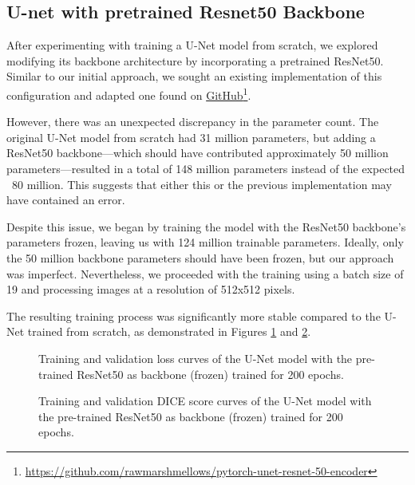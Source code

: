 \subsection{U-net with pretrained Resnet50 Backbone}

After experimenting with training a U-Net model from scratch, we explored modifying its backbone 
architecture by incorporating a pretrained ResNet50. Similar to our initial approach, we sought 
an existing implementation of this configuration and adapted one found on \href{https://github.com/rawmarshmellows/pytorch-unet-resnet-50-encoder}{GitHub}\footnote{\url{https://github.com/rawmarshmellows/pytorch-unet-resnet-50-encoder}}. 

However, there was an unexpected discrepancy in the parameter count. The original U-Net model from 
scratch had 31 million parameters, but adding a ResNet50 backbone—which should have contributed 
approximately 50 million parameters—resulted in a total of 148 million parameters instead of the 
expected ~80 million. This suggests that either this or the previous implementation may have 
contained an error.

Despite this issue, we began by training the model with the ResNet50 backbone's parameters frozen, 
leaving us with 124 million trainable parameters. Ideally, only the 50 million backbone parameters 
should have been frozen, but our approach was imperfect. Nevertheless, we proceeded with the training 
using a batch size of 19 and processing images at a resolution of 512x512 pixels.

The resulting training process was significantly more stable compared to the U-Net trained from 
scratch, as demonstrated in Figures \ref{fig:renet50_frozen_loss_curve} and \ref{fig:renet50_frozen_dice_curve}.


\begin{figure}[ht]
    \centering
    \caption{Training and validation loss curves of the U-Net model with the pre-trained ResNet50 as backbone (frozen) trained for 200 epochs.}
    \label{fig:renet50_frozen_loss_curve}
\end{figure}

\begin{figure}[ht]
    \centering
    \caption{Training and validation DICE score curves of the U-Net model with the pre-trained ResNet50 as backbone (frozen) trained for 200 epochs.}
    \label{fig:renet50_frozen_dice_curve}
\end{figure}


